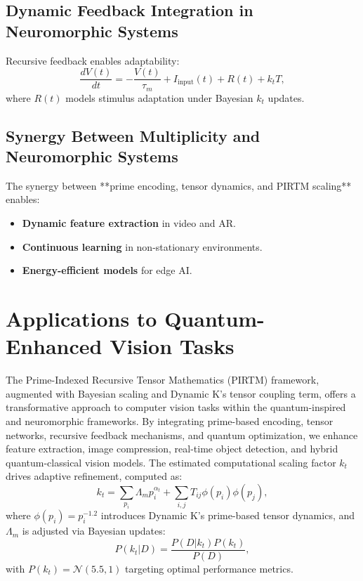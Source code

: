 \documentclass{article}
\theoremstyle{plain}
\begin{document}
\subsection{Dynamic Feedback Integration in Neuromorphic Systems}
Recursive feedback enables adaptability:
\begin{equation}
\frac{dV(t)}{dt} = -\frac{V(t)}{\tau_m} + I_\text{input}(t) + R(t) + k_t T,
\end{equation}
where \( R(t) \) models stimulus adaptation under Bayesian \( k_t \) updates.

\subsection{Synergy Between Multiplicity and Neuromorphic Systems}
The synergy between **prime encoding, tensor dynamics, and PIRTM scaling** enables:
\begin{itemize}
    \item \textbf{Dynamic feature extraction} in video and AR.
    \item \textbf{Continuous learning} in non-stationary environments.
    \item \textbf{Energy-efficient models} for edge AI.
\end{itemize}
\section{Applications to Quantum-Enhanced Vision Tasks}
The Prime-Indexed Recursive Tensor Mathematics (PIRTM) framework, augmented with Bayesian scaling and Dynamic K’s tensor coupling term, offers a transformative approach to computer vision tasks within the quantum-inspired and neuromorphic frameworks. By integrating prime-based encoding, tensor networks, recursive feedback mechanisms, and quantum optimization, we enhance feature extraction, image compression, real-time object detection, and hybrid quantum-classical vision models. The estimated computational scaling factor \( k_t \) drives adaptive refinement, computed as:
\begin{equation}
    k_t = \sum_{p_i} \Lambda_m p_i^{\alpha_t} + \sum_{i,j} T_{ij} \phi(p_i) \phi(p_j),
\end{equation}
where \( \phi(p_i) = p_i^{-1.2} \) introduces Dynamic K’s prime-based tensor dynamics, and \( \Lambda_m \) is adjusted via Bayesian updates:
\begin{equation}
    P(k_t | D) = \frac{P(D | k_t) P(k_t)}{P(D)},
\end{equation}
with \( P(k_t) = \mathcal{N}(5.5, 1) \) targeting optimal performance metrics.
\end{document}
